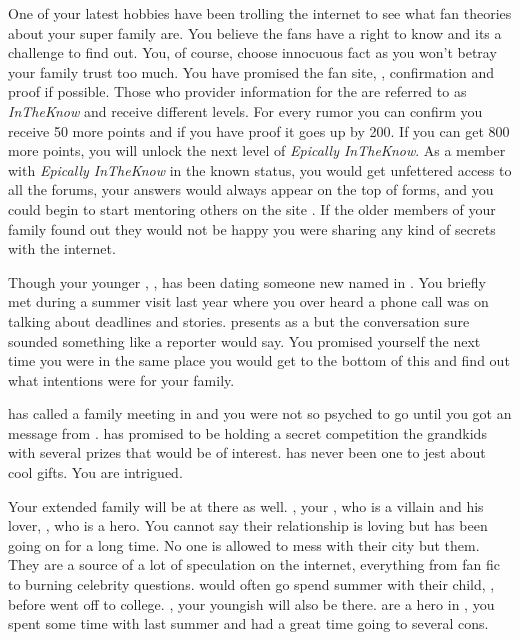 \documentclass[char]{LRSguildcamp1}
\begin{document}
One of your latest hobbies have been trolling the internet to see what fan theories about your super family are. You believe the fans have a right to know and its a challenge to find out. You, of course, choose innocuous fact as you won't betray your family trust too much. You have promised the fan site, \pTweenwebsite{}, confirmation and proof if possible. Those who provider information for the \pTweenwebsite{} are referred to as \textsl{InTheKnow} and receive different levels.  For every rumor you can confirm you receive 50 more points and if you have proof it goes up by 200. If you can get 800 more points, you will unlock the next level of \textit{Epically InTheKnow}. As a member with \textit{Epically InTheKnow} in the known status, you would get unfettered access to all the forums, your answers would always appear on the top of forms, and you could begin to start mentoring others on the site \pTweenwebsite{}. If the older members of your family found out they would not be happy you were sharing any kind of secrets with the internet. 

Though your younger \cYoungest{\uncle}, \cYoungest{}, has been dating someone new  \cAS{\hero} named \cAS{} in \pCityYoungest{}. You briefly met \cAS{} during a summer visit last year where you over heard a phone call \cAS{\they} was on talking about deadlines and stories. \cAS{} presents as a \cAS{\hero} but the conversation sure sounded something like a reporter would say. You promised yourself the next time you were in the same place you would get to the bottom of this and find out what \cAS{\their} intentions were for your family.

\cGrandma{} has called a family meeting in \pCityGrandma{} and you were not so psyched to go until you got an message from \cGrandma{}. \cGrandma{\they} has promised to be holding a secret competition the grandkids with several prizes that would be of interest. \cGrandma{} has never been one to jest about cool gifts. You are intrigued.  

Your extended family will be at there as well. \cOldest{}, your \cOldest{\uncle}, who is a villain and his lover, \cOS{}, who is a hero. You cannot say their relationship is loving but has been going on for a long time. No one is allowed to mess with their city but them. They are a source of a lot of speculation on the internet, everything from fan fic to burning celebrity questions. \cTeen{} would often go spend summer with their child, \cGrad{}, before \cGrad{\they} went off to college.  \cYoungest{}, your youngish \cYoungest{\uncle} will also be there.  are a hero in \pCityYoungest{}, you spent some time with \cYoungest{\them} last summer and had a great time going to several cons.  
\end{document}
